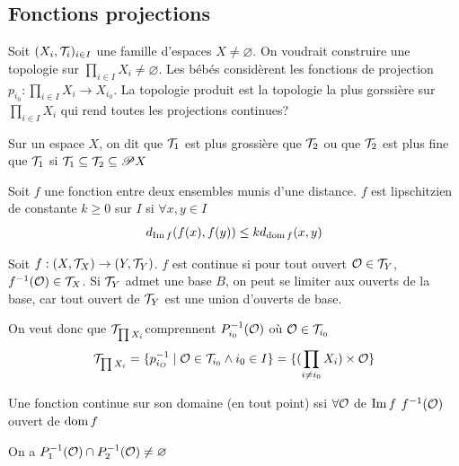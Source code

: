 \subsection{Fonctions projections}
Soit $(X_i,\mathcal{T}_i)_{i\in I}$ une famille d'espaces $X\ne\varnothing$. On voudrait construire une topologie sur $\prod_{i\in I}X_i\ne\varnothing$. 
Les bébés considèrent les fonctions de projection $p_{i_0} : \prod_{i\in I}X_i\to X_{i_0}$. La topologie produit est la topologie la plus gorssière sur $\prod_{i\in I}X_i$ qui rend toutes les projections continues? 
\begin{definition}
    Sur un espace $X$, on dit que $\mathcal{T}_1$ est plus grossière  que $\mathcal{T}_2$ ou que $\mathcal{T}_2$ est plus fine que $\mathcal{T}_1$ si $\mathcal{T}_1\subseteq \mathcal{T}_2\subseteq\mathscr{P} X$
\end{definition}
\begin{definition}
Soit $f$ une fonction entre deux ensembles munis d'une distance.
    $f$ est lipschitzien de constante $k\ge 0$ sur $I$ si $\forall x,y\in I$ $$d_{\operatorname{Im} f}(f(x),f(y))\le k d_{\operatorname{dom} f}(x,y)$$
\end{definition}
\begin{definition}[Rappel]
    Soit $f:(X,\mathcal{T}_X)\to(Y,\mathcal{T}_Y)$. $f$ est continue si pour tout ouvert $\mathcal{O}\in\mathcal{T}_Y$, $f^{-1}(\mathcal{O})\in\mathcal{T}_X$. Si $\mathcal{T}_Y$ admet une base $B$, on peut se limiter aux ouverts de la base, car tout ouvert de $\mathcal{T}_Y$ est une union d'ouverts de base. 
\end{definition}
On veut donc que $\mathcal{T}_{\prod X_i}$comprennent $P_{i_0}^{-1}(\mathcal{O})$ où $\mathcal{O} \in \mathcal{T}_{i_0}$
$$\mathcal{T}_{\prod X_i} = \{p_{i_O}^{-1}\mid \mathcal{O}\in\mathcal{T}_{i_0}\land i_0\in I\} = \{(\prod_{i\ne i_0}X_i)\times \mathcal{O}\}$$

\begin{exercice}
    Une fonction continue sur son domaine (en tout point) ssi $\forall \mathcal{O}$ de $\operatorname{Im} f$ $f^{-1}(\mathcal{O})$ ouvert de $\operatorname{dom} f$
\end{exercice}

\begin{remarque}
On a $P_1^{-1}(\mathcal{O} ) \cap P_2^{-1}(\mathcal{O})\neq \varnothing$ 
\end{remarque}

